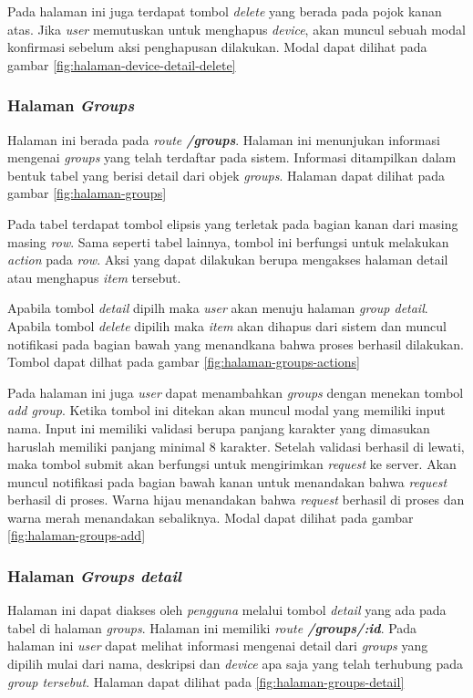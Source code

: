 Pada halaman ini juga terdapat tombol \textit{delete} yang berada pada pojok kanan atas. Jika \textit{user} memutuskan untuk menghapus \textit{device}, akan muncul sebuah modal konfirmasi sebelum aksi penghapusan dilakukan. Modal dapat dilihat pada gambar \ref{fig:halaman-device-detail-delete}

\subsubsection{Halaman \textit{Groups}}
Halaman ini berada pada \textit{route \textbf{/groups}}. Halaman ini menunjukan informasi mengenai \textit{groups} yang telah terdaftar pada sistem. Informasi ditampilkan dalam bentuk tabel yang berisi detail dari objek \textit{groups}. Halaman dapat dilihat pada gambar \ref{fig:halaman-groups}

Pada tabel terdapat tombol elipsis yang terletak pada bagian kanan dari masing masing \textit{row}. Sama seperti tabel lainnya, tombol ini berfungsi untuk melakukan \textit{action} pada \textit{row}. Aksi yang dapat dilakukan berupa mengakses halaman detail atau menghapus \textit{item} tersebut.

Apabila tombol \textit{detail} dipilh maka \textit{user} akan menuju halaman \textit{group detail}. Apabila tombol \textit{delete} dipilih maka \textit{item} akan dihapus dari sistem dan muncul notifikasi pada bagian bawah yang menandkana bahwa proses berhasil dilakukan. Tombol dapat dilhat pada gambar \ref{fig:halaman-groups-actions}

Pada halaman ini juga \textit{user} dapat menambahkan \textit{groups} dengan menekan tombol \textit{add group}. Ketika tombol ini ditekan akan muncul modal yang memiliki input nama. Input ini memiliki validasi berupa panjang karakter yang dimasukan haruslah memiliki panjang minimal 8 karakter. Setelah validasi berhasil di lewati, maka tombol submit akan berfungsi untuk mengirimkan \textit{request} ke server. Akan muncul notifikasi pada bagian bawah kanan untuk menandakan bahwa \textit{request} berhasil di proses. Warna hijau menandakan bahwa \textit{request} berhasil di proses dan warna merah menandakan sebaliknya. Modal dapat dilihat pada gambar \ref{fig:halaman-groups-add}

\subsubsection{Halaman \textit{Groups detail}}
Halaman ini dapat diakses oleh \textit{pengguna} melalui tombol \textit{detail} yang ada pada tabel di halaman \textit{groups}. Halaman ini memiliki \textit{route \textbf{/groups/:id}}. Pada halaman ini \textit{user} dapat melihat informasi mengenai detail dari \textit{groups} yang dipilih mulai dari nama, deskripsi dan \textit{device} apa saja yang telah terhubung pada \textit{group tersebut}. Halaman dapat dilihat pada \ref{fig:halaman-groups-detail}

